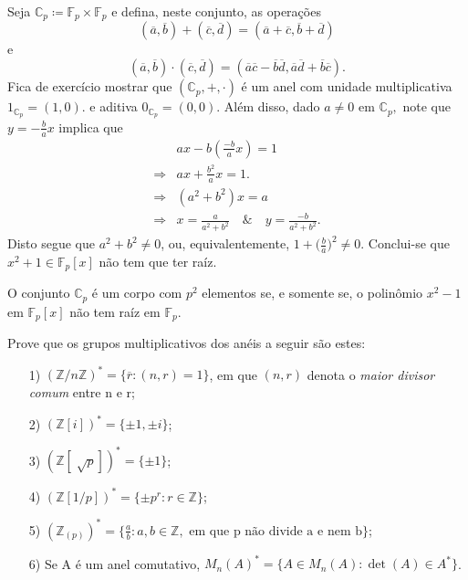 \documentclass[algebraII_notes.tex]{subfiles}
\begin{document}
Seja \(\mathbb{C}_{p}\coloneqq \mathbb{F}_{p}\times \mathbb{F}_{p}\) e defina, neste conjunto, as operações
\[
	(\overline{a}, \overline{b}) + (\overline{c}, \overline{d}) = (\overline{a}+\overline{c}, \overline{b}+\overline{d})
\]
e
\[
	(\overline{a}, \overline{b})\cdot (\overline{c}, \overline{d}) = (\overline{a}\overline{c} - \overline{b}\overline{d}, \overline{a}\overline{d}+\overline{b}\overline{c}).
\]
Fica de exercício mostrar que \((\mathbb{C}_{p}, +, \cdot )\) é um anel com unidade multiplicativa \(1_{\mathbb{C}_{p}} = (1, 0).\) e aditiva \(0_{\mathbb{C}_{p}} = (0, 0).\)
Além disso, dado \(a\neq 0\) em \(\mathbb{C}_{p},\) note que \(y = -\frac{b}{a}x\) implica que
\begin{align*}
	            & ax - b(\frac{-b}{a}x) = 1                                          \\
	\Rightarrow & ax + \frac{b^{2}}{a}x = 1.                                         \\
	\Rightarrow & (a^{2} + b^{2})x = a                                               \\
	\Rightarrow & x = \frac{a}{a^{2}+b^{2}} \quad\&\quad y = \frac{-b}{a^{2}+b^{2}}.
\end{align*}
Disto segue que \(a^{2} + b^{2}\neq 0\), ou, equivalentemente, \(1 + \biggl(\frac{b}{a}\biggr)^{2}\neq 0\). Conclui-se que \(x^{2}+1\in \mathbb{F}_{p}[x]\) não tem que ter raíz.
\begin{prop*}
	O conjunto \(\mathbb{C}_{p}\) é um corpo com \(p^{2}\) elementos se, e somente se, o polinômio \(x^{2}-1 \) em \(\mathbb{F}_{p}[x]\) não tem raíz em \(\mathbb{F}_{p}.\)
\end{prop*}
\begin{example}[Exercício]
	Prove que os grupos multiplicativos dos anéis a seguir são estes:
	\begin{itemize}
		\item[1)] \((\mathbb{Z}/n \mathbb{Z})^{*} = \{\overline{r}: (n, r) = 1\}\), em que \((n, r)\) denota o \textit{maior divisor comum} entre n e r;
		\item[2)] \((\mathbb{Z}[i])^{*}=\{\pm1, \pm i\}\);
		\item[3)] \((\mathbb{Z}[\sqrt[]{p}])^{*} = \{\pm1\}\);
		\item[4)] \((\mathbb{Z}[1/p])^{*} = \{\pm p^{r}: r\in \mathbb{Z}\}\);
		\item[5)] \((\mathbb{Z}_{(p)})^{*} = \biggl\{\frac{a}{b}: a, b\in \mathbb{Z}, \text{ em que p não divide a e nem b}\biggr\}\);
		\item[6)] Se A é um anel comutativo, \(M_{n}(A)^{*} = \{A\in M_{n}(A): \det{(A)}\in A^{*}\}\).
	\end{itemize}
\end{example}
\end{document}
